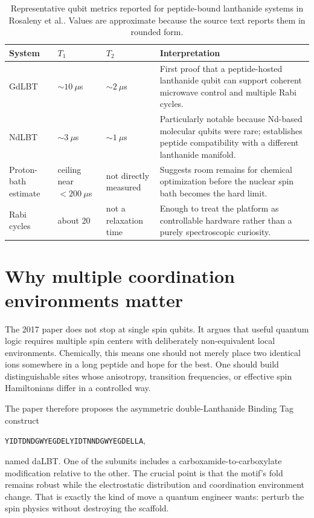 \documentclass[11pt]{report}
\newcommand{\lbt}{Lanthanide Binding Tag}
\newcommand{\dalbt}{daLBT}
\newcommand{\ham}{Hamiltonian}
\newcommand{\etal}{et al.}
\theoremstyle{definition}
\begin{document}
\begin{table}[ht]
\centering
\caption{Representative qubit metrics reported for peptide-bound lanthanide systems in Rosaleny \etal{}. Values are approximate because the source text reports them in rounded form.}
\begin{tabular}{>{\raggedright\arraybackslash}p{2.4cm} >{\raggedright\arraybackslash}p{2.2cm} >{\raggedright\arraybackslash}p{2.2cm} >{\raggedright\arraybackslash}p{5.2cm}}
\toprule
System & $T_1$ & $T_2$ & Interpretation \\
\midrule
GdLBT & $\sim 10~\mu$s & $\sim 2~\mu$s & First proof that a peptide-hosted lanthanide qubit can support coherent microwave control and multiple Rabi cycles. \\
NdLBT & $\sim 3~\mu$s & $\sim 1~\mu$s & Particularly notable because Nd-based molecular qubits were rare; establishes peptide compatibility with a different lanthanide manifold. \\
Proton-bath estimate & ceiling near $< 200~\mu$s & not directly measured & Suggests room remains for chemical optimization before the nuclear spin bath becomes the hard limit. \\
Rabi cycles & about 20 & not a relaxation time & Enough to treat the platform as controllable hardware rather than a purely spectroscopic curiosity. \\
\bottomrule
\end{tabular}
\end{table}

\section{Why multiple coordination environments matter}
The 2017 paper does not stop at single spin qubits. It argues that useful quantum logic requires multiple spin centers with deliberately non-equivalent local environments. Chemically, this means one should not merely place two identical ions somewhere in a long peptide and hope for the best. One should build distinguishable sites whose anisotropy, transition frequencies, or effective spin \ham{}s differ in a controlled way.

The paper therefore proposes the asymmetric double-\lbt{} construct
\begin{center}
\texttt{YIDTDNDGWYEGDELYIDTNNDGWYEGDELLA},
\end{center}
named \dalbt{}. One of the subunits includes a carboxamide-to-carboxylate modification relative to the other. The crucial point is that the motif's fold remains robust while the electrostatic distribution and coordination environment change. That is exactly the kind of move a quantum engineer wants: perturb the spin physics without destroying the scaffold.
\end{document}
